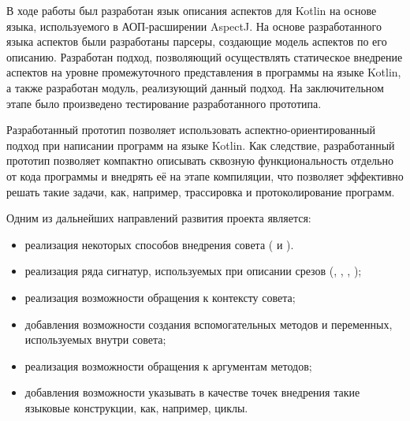 \conclusion
В ходе работы был разработан язык описания аспектов для Kotlin на основе языка, используемого в АОП-расширении AspectJ.
На основе разработанного языка аспектов были разработаны парсеры, создающие модель аспектов по его описанию.
Разработан подход, позволяющий осуществлять статическое внедрение аспектов на уровне промежуточного представления в программы на языке Kotlin, а также разработан модуль, реализующий данный подход.
На заключительном этапе было произведено тестирование разработанного прототипа.

Разработанный прототип позволяет использовать аспектно-ориентированный подход при написании программ на языке Kotlin.
Как следствие, разработанный прототип позволяет компактно описывать сквозную функциональность отдельно от кода программы и внедрять её на этапе компиляции, что позволяет эффективно решать такие задачи, как, например, трассировка и протоколирование программ.

Одним из дальнейших направлений развития проекта является:
\begin{itemize}
	\item реализация некоторых способов внедрения совета ( и ).
	\item реализация ряда сигнатур, используемых при описании срезов (, , , );
	\item реализация возможности обращения к контексту совета;
	\item добавления возможности создания вспомогательных методов и переменных, используемых внутри совета;
	\item реализация возможности обращения к аргументам методов;
	\item добавления возможности указывать в качестве точек внедрения такие языковые конструкции, как, например, циклы.
\end{itemize}


